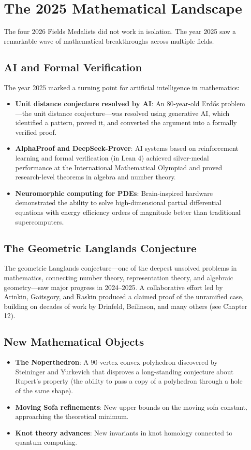 \section{The 2025 Mathematical Landscape}

The four 2026 Fields Medalists did not work in isolation. The year 2025 saw a remarkable wave of mathematical breakthroughs across multiple fields.

\subsection{AI and Formal Verification}
The year 2025 marked a turning point for artificial intelligence in mathematics:
\begin{itemize}
\item \textbf{Unit distance conjecture resolved by AI}: An 80-year-old Erd\H{o}s problem---the unit distance conjecture---was resolved using generative AI, which identified a pattern, proved it, and converted the argument into a formally verified proof.
\item \textbf{AlphaProof and DeepSeek-Prover}: AI systems based on reinforcement learning and formal verification (in Lean 4) achieved silver-medal performance at the International Mathematical Olympiad and proved research-level theorems in algebra and number theory.
\item \textbf{Neuromorphic computing for PDEs}: Brain-inspired hardware demonstrated the ability to solve high-dimensional partial differential equations with energy efficiency orders of magnitude better than traditional supercomputers.
\end{itemize}

\subsection{The Geometric Langlands Conjecture}
The geometric Langlands conjecture---one of the deepest unsolved problems in mathematics, connecting number theory, representation theory, and algebraic geometry---saw major progress in 2024--2025. A collaborative effort led by Arinkin, Gaitsgory, and Raskin produced a claimed proof of the unramified case, building on decades of work by Drinfeld, Beilinson, and many others (see Chapter 12).

\subsection{New Mathematical Objects}
\begin{itemize}
\item \textbf{The Noperthedron}: A 90-vertex convex polyhedron discovered by Steininger and Yurkevich that disproves a long-standing conjecture about Rupert's property (the ability to pass a copy of a polyhedron through a hole of the same shape).
\item \textbf{Moving Sofa refinements}: New upper bounds on the moving sofa constant, approaching the theoretical minimum.
\item \textbf{Knot theory advances}: New invariants in knot homology connected to quantum computing.
\end{itemize}

